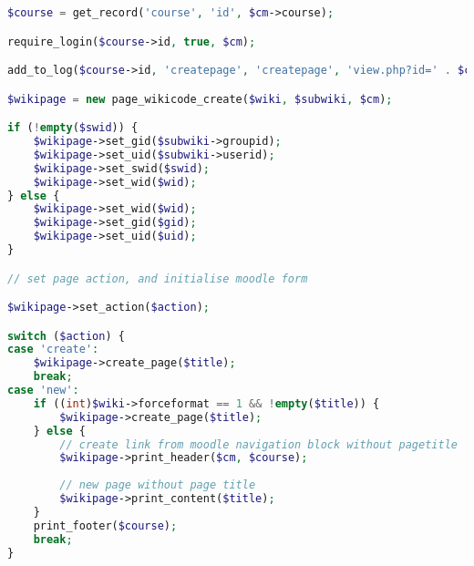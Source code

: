 \begin{lstlisting}[language=PHP]
$course = get_record('course', 'id', $cm->course);

require_login($course->id, true, $cm);

add_to_log($course->id, 'createpage', 'createpage', 'view.php?id=' . $cm->id, $wiki->id);

$wikipage = new page_wikicode_create($wiki, $subwiki, $cm);

if (!empty($swid)) {
    $wikipage->set_gid($subwiki->groupid);
    $wikipage->set_uid($subwiki->userid);
    $wikipage->set_swid($swid);
	$wikipage->set_wid($wid);
} else {
    $wikipage->set_wid($wid);
    $wikipage->set_gid($gid);
    $wikipage->set_uid($uid);
}

// set page action, and initialise moodle form

$wikipage->set_action($action);

switch ($action) {
case 'create':	
    $wikipage->create_page($title);
    break;
case 'new':
    if ((int)$wiki->forceformat == 1 && !empty($title)) {
        $wikipage->create_page($title);
    } else {
        // create link from moodle navigation block without pagetitle
        $wikipage->print_header($cm, $course);
        
        // new page without page title
        $wikipage->print_content($title);
    }
    print_footer($course);
    break;
}

\end{lstlisting}

